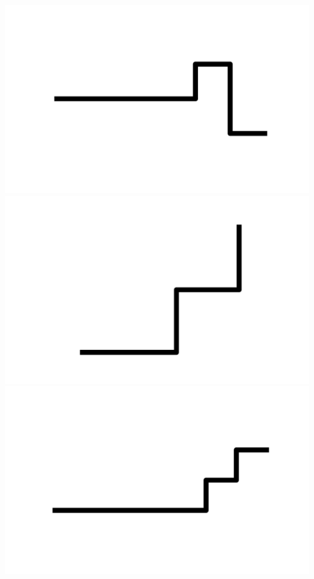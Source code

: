 \documentclass[]{report}
\begin{document}
\includegraphics[scale=.1]{pictures/21/state_cluster_shapes_406.pdf} 
\includegraphics[scale=.1]{pictures/21/state_cluster_shapes_407.pdf} 
\includegraphics[scale=.1]{pictures/21/state_cluster_shapes_408.pdf} 
\end{document}
